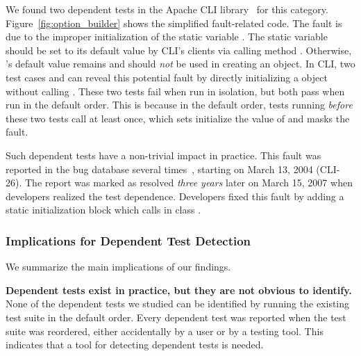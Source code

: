 We found two dependent tests in
the Apache CLI library~\cite{cli} for this category.
Figure~\ref{fig:option_builder} shows the simplified fault-related
code. The fault is due to the improper initialization of the static variable
. The static variable  should be set
to its default value  by CLI's clients via calling
method . Otherwise, 's
default value remains  and should \emph{not} be
used in creating an  object.
In CLI, two test cases 
 and 
can reveal this potential fault by directly initializing
a  object without calling .
These two tests fail when run in isolation,
but both pass when run in the default order. This is because
in the default order, tests running \emph{before} these
two tests call  at least once, which sets
initialize the value of  and masks the fault.


Such dependent tests have a non-trivial impact in practice.
This fault was reported in the bug database several times~\cite{clibug},
starting on March 13, 2004 (CLI-26). The report was marked as resolved
\emph{three years} later on March 15, 2007 when developers
realized the test dependence. Developers fixed this
fault by adding a static initialization block which
calls  in class .



\subsubsection{Implications for Dependent Test Detection}

We summarize the main implications of our findings.

\noindent \textbf{{Dependent tests exist in practice, but
they are not obvious to identify.}}
None of the dependent tests we studied can be identified by
running the existing test suite in the default order. 
Every dependent test was reported when the
test suite was reordered, either accidentally by a user or
by a testing tool. This indicates that
a tool for detecting dependent tests is needed.

